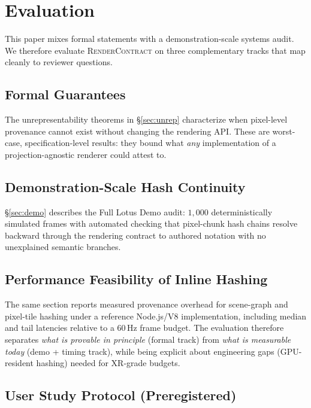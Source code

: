 \documentclass[sigconf,nonacm]{acmart}
\newcommand{\rendercontract}{\textsc{RenderContract}}
\begin{document}
\section{Evaluation}
\label{sec:evaluation}

This paper mixes formal statements with a demonstration-scale systems audit.
We therefore evaluate \rendercontract{} on three complementary tracks that
map cleanly to reviewer questions.

\subsection{Formal Guarantees}
The unrepresentability theorems in \S\ref{sec:unrep} characterize
when pixel-level provenance cannot exist without changing the rendering API.
These are worst-case, specification-level results: they bound what \emph{any}
implementation of a projection-agnostic renderer could attest to.

\subsection{Demonstration-Scale Hash Continuity}
\S\ref{sec:demo} describes the Full Lotus Demo audit: $1{,}000$ deterministically
simulated frames with automated checking that pixel-chunk hash chains resolve
backward through the rendering contract to authored \hsplus{} notation with
no unexplained semantic branches.

\subsection{Performance Feasibility of Inline Hashing}
The same section reports measured provenance overhead for scene-graph and
pixel-tile hashing under a reference Node.js/V8 implementation, including
median and tail latencies relative to a 60\,Hz frame budget. The evaluation
therefore separates \emph{what is provable in principle} (formal track) from
\emph{what is measurable today} (demo + timing track), while being explicit
about engineering gaps (GPU-resident hashing) needed for XR-grade budgets.


\subsection{User Study Protocol (Preregistered)}
\label{sec:user-study}
\end{document}
